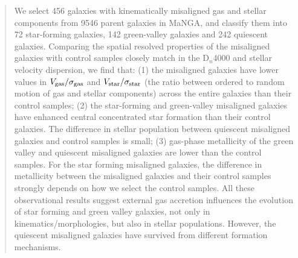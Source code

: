 \begin{abstract}
    We select 456 galaxies with kinematically misaligned gas and stellar components from 9546 parent galaxies in MaNGA, and classify them into 72 star-forming galaxies, 142 green-valley galaxies and 242 quiescent galaxies. Comparing the spatial resolved properties of the misaligned galaxies with control samples closely match in the D$_n$4000 and stellar velocity dispersion, we find that: (1) the misaligned galaxies have lower values in $V_{\rm gas}/{\sigma}_{\rm gas}$ and $V_{\rm star}/{\sigma}_{\rm star}$ (the ratio between ordered to random motion of gas and stellar components) across the entire galaxies than their control samples; (2) the star-forming and green-valley misaligned galaxies have enhanced central concentrated star formation than their control galaxies. The difference in stellar population between quiescent misaligned galaxies and control samples is small; (3) gas-phase metallicity of the green valley and quiescent misaligned galaxies are lower than the control samples. For the star forming misaligned galaxies, the difference in metallicity between the misaligned galaxies and their control samples strongly depends on how we select the control samples. All these observational results suggest external gas accretion influences the evolution of star forming and green valley galaxies, not only in kinematics/morphologies, but also in stellar populations. However, the quiescent misaligned galaxies have survived from different formation mechanisms.    
\end{abstract}
